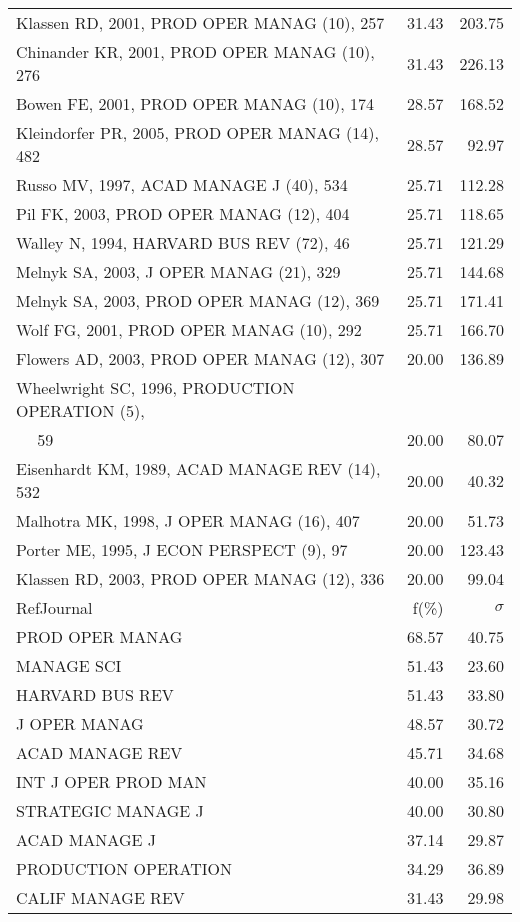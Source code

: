 \documentclass[a4paper,11pt]{report}
\begin{document}
\begin{landscape}
\begin{table}[!ht]
{\begin{tabular}{|l r r|}
Klassen RD, 2001, PROD OPER MANAG (10), 257 & 31.43 & 203.75\\
Chinander KR, 2001, PROD OPER MANAG (10), 276 & 31.43 & 226.13\\
Bowen FE, 2001, PROD OPER MANAG (10), 174 & 28.57 & 168.52\\
Kleindorfer PR, 2005, PROD OPER MANAG (14), 482 & 28.57 & 92.97\\
Russo MV, 1997, ACAD MANAGE J (40), 534 & 25.71 & 112.28\\
Pil FK, 2003, PROD OPER MANAG (12), 404 & 25.71 & 118.65\\
Walley N, 1994, HARVARD BUS REV (72), 46 & 25.71 & 121.29\\
Melnyk SA, 2003, J OPER MANAG (21), 329 & 25.71 & 144.68\\
Melnyk SA, 2003, PROD OPER MANAG (12), 369 & 25.71 & 171.41\\
Wolf FG, 2001, PROD OPER MANAG (10), 292 & 25.71 & 166.70\\
Flowers AD, 2003, PROD OPER MANAG (12), 307 & 20.00 & 136.89\\
Wheelwright SC, 1996, PRODUCTION OPERATION (5), &  & \\
$\quad$ 59 & 20.00 & 80.07\\
Eisenhardt KM, 1989, ACAD MANAGE REV (14), 532 & 20.00 & 40.32\\
Malhotra MK, 1998, J OPER MANAG (16), 407 & 20.00 & 51.73\\
Porter ME, 1995, J ECON PERSPECT (9), 97 & 20.00 & 123.43\\
Klassen RD, 2003, PROD OPER MANAG (12), 336 & 20.00 & 99.04\\
\hline
\hline
RefJournal & f(\%) & $\sigma$\\
\hline
PROD OPER MANAG & 68.57 & 40.75\\
MANAGE SCI & 51.43 & 23.60\\
HARVARD BUS REV & 51.43 & 33.80\\
J OPER MANAG & 48.57 & 30.72\\
ACAD MANAGE REV & 45.71 & 34.68\\
INT J OPER PROD MAN & 40.00 & 35.16\\
STRATEGIC MANAGE J & 40.00 & 30.80\\
ACAD MANAGE J & 37.14 & 29.87\\
PRODUCTION OPERATION & 34.29 & 36.89\\
CALIF MANAGE REV & 31.43 & 29.98\\
\hline
\end{tabular}
}
\end{table}


\end{landscape}
\end{document}
